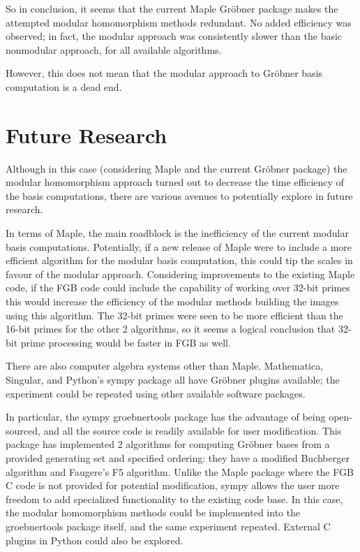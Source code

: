 \documentclass[letterpaper,12pt,titlepage,oneside,final]{book}
\begin{document}
So in conclusion, it seems that the current Maple Gr\"obner package makes the attempted modular homomorphism methods redundant.  No added efficiency was observed; in fact, the modular approach was consistently slower than the basic nonmodular approach, for all available algorithms.  

However, this does not mean that the modular approach to Gr\"obner basis computation is a dead end. 

\section{Future Research}    

Although in this case (considering Maple and the current Gr\"obner package) the modular homomorphism approach turned out to decrease the time efficiency of the basis computations, there are various avenues to potentially explore in future research.  

In terms of Maple, the main roadblock is the inefficiency of the current modular basis computations.  Potentially, if a new release of Maple were to include a more efficient algorithm for the modular basis computation, this could tip the scales in favour of the modular approach.  Considering improvements to the existing Maple code, if the FGB code could include the capability of working over 32-bit primes this would increase the efficiency of the modular methods building the images using this algorithm.  The 32-bit primes were seen to be more efficient than the 16-bit primes for the other 2 algorithms, so it seems a logical conclusion that 32-bit prime processing would be faster in FGB as well.  

There are also computer algebra systems other than Maple.  Mathematica, Singular, and Python's sympy package all have Gr\"obner plugins available; the experiment could be repeated using other available software packages.  

In particular, the sympy groebnertools package has the advantage of being open-sourced, and all the source code is readily available for user modification.  This package has implemented 2 algorithms for computing Gr\"obner bases from a provided generating set and specified ordering: they have a modified Buchberger algorithm and Faugere's F5 algorithm.  Unlike the Maple package where the FGB C code is not provided for potential modification, sympy allows the user more freedom to add specialized functionality to the existing code base.  In this case, the modular homomorphism methods could be implemented into the groebnertools package itself, and the same experiment repeated.  External C plugins in Python could also be explored.
\end{document}
